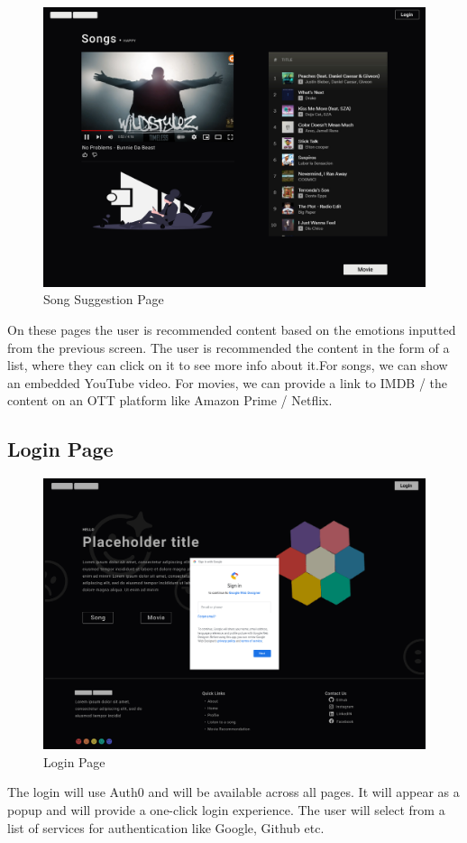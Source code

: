 \begin{figure}[H]
\centering
\includegraphics[width=\textwidth]{imgs/ui5.png}
\caption{Song Suggestion Page}
\label{fig: ui5}
\end{figure}
On these pages the user is recommended content based on the emotions inputted from the previous screen. The user is recommended the content in the form of a list, where they can click on it to see more info about it.For songs, we can show an embedded YouTube video. For movies, we can provide a link to IMDB / the content on an OTT platform like Amazon Prime / Netflix.

\subsection{Login Page}
\begin{figure}[H]
\centering
\includegraphics[width=\textwidth]{imgs/ui6.png}
\caption{Login Page}
\label{fig: ui6}
\end{figure}
The login will use Auth0 and will be available across all pages. It will appear as a popup and will provide a one-click login experience. The user will select from a list of services for authentication like Google, Github etc.

